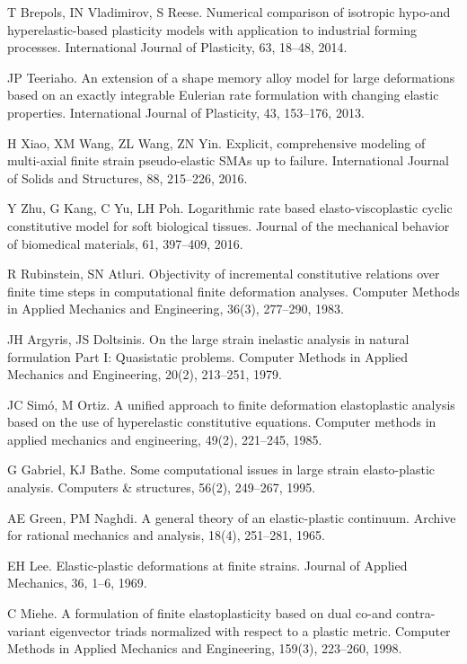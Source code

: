 \documentclass[preprint,review,12pt,sort&compress]{elsarticle}%
\begin{document}
\begin{thebibliography}{99}
T Brepols, IN Vladimirov, S Reese.
Numerical comparison of isotropic hypo-and hyperelastic-based plasticity
models with application to industrial forming processes. International Journal
of Plasticity, 63, 18--48, 2014.

JP Teeriaho. An extension of a shape memory alloy model
for large deformations based on an exactly integrable Eulerian rate
formulation with changing elastic properties. International Journal of
Plasticity, 43, 153--176, 2013.

H Xiao, XM Wang, ZL Wang, ZN Yin. Explicit, comprehensive
modeling of multi-axial finite strain pseudo-elastic SMAs up to failure.
International Journal of Solids and Structures, 88, 215--226, 2016.

Y Zhu, G Kang, C Yu, LH Poh. Logarithmic rate based
elasto-viscoplastic cyclic constitutive model for soft biological tissues.
Journal of the mechanical behavior of biomedical materials, 61, 397--409, 2016.

R Rubinstein, SN Atluri. Objectivity of
incremental constitutive relations over finite time steps in computational
finite deformation analyses. Computer Methods in Applied Mechanics and
Engineering, 36(3), 277--290, 1983.

JH Argyris, JS Doltsinis. On the large strain
inelastic analysis in natural formulation Part I: Quasistatic problems.
Computer Methods in Applied Mechanics and Engineering, 20(2), 213--251, 1979.

JC Sim\'{o}, M Ortiz. A unified approach to finite
deformation elastoplastic analysis based on the use of hyperelastic
constitutive equations. Computer methods in applied mechanics and engineering,
49(2), 221--245, 1985.

G Gabriel, KJ Bathe. Some computational issues in
large strain elasto-plastic analysis. Computers \& structures, 56(2),
249--267, 1995.

AE Green, PM Naghdi. A general theory of an
elastic-plastic continuum. Archive for rational mechanics and analysis, 18(4),
251--281, 1965.

EH Lee. Elastic-plastic deformations at finite strains.
Journal of Applied Mechanics, 36, 1--6, 1969.

C Miehe. A formulation of finite elastoplasticity based on
dual co-and contra-variant eigenvector triads normalized with respect to a
plastic metric. Computer Methods in Applied Mechanics and Engineering, 159(3),
223--260, 1998.


\end{thebibliography}
\end{document}
